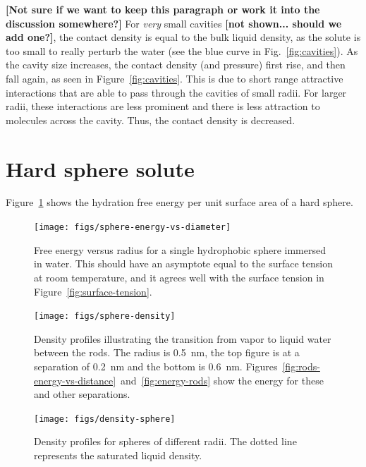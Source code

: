 \documentclass[letterpaper,twocolumn,amsmath,amssymb,prb]{revtex4-1}
\newcommand{\red}[1]{{\bf \color{red} #1}}
\newcommand{\fixme}[1]{\red{[#1]}}
\begin{document}
\fixme{Not sure if we want to keep this paragraph or work it into the
  discussion somewhere?} For \emph{very} small cavities \fixme{not
  shown... should we add one?}, the contact density is equal to the
bulk liquid density, as the solute is too small to really perturb the
water (see the blue curve in Fig.~\ref{fig:cavities}).  As the cavity
size increases, the contact density (and pressure) first rise, and
then fall again, as seen in Figure~\ref{fig:cavities}.  This is due to
short range attractive interactions that are able to pass through the
cavities of small radii.  For larger radii, these interactions are
less prominent and there is less attraction to molecules across the
cavity.  Thus, the contact density is decreased.

\section{Hard sphere solute}

Figure~\ref{fig:sphere-energy-vs-diameter} shows the hydration free
energy per unit surface area of a hard sphere.

\begin{figure}
\begin{center}
\texttt{[image: figs/sphere-energy-vs-diameter]}
\end{center}
\caption{ Free energy versus radius for a single hydrophobic sphere
immersed in water. This should have an asymptote equal to the surface
tension at room temperature, and it agrees well with the surface tension in
Figure~\ref{fig:surface-tension}. }
\label{fig:sphere-energy-vs-diameter}
\end{figure}

\begin{figure}
\begin{center}
\texttt{[image: figs/sphere-density]}
\end{center}
\caption{ Density profiles illustrating the transition from vapor 
to liquid water between the rods. The radius is 0.5~nm, the top figure is 
at a separation of 0.2~nm and the
bottom is 0.6~nm. Figures~\ref{fig:rods-energy-vs-distance}~and~\ref{fig:energy-rods} show
the energy for these and other separations.}
\label{fig:sphere-density}
\end{figure}


\begin{figure}
\begin{center}
\texttt{[image: figs/density-sphere]}
\end{center}
\caption{ Density profiles for spheres of different radii. The dotted line
represents the saturated liquid density.  }
\label{fig:density-sphere}
\end{figure}
\end{document}
